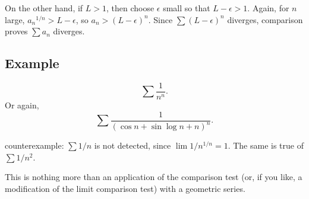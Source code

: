 \documentclass[12pt]{article}
\begin{document}
On the other hand, if $L > 1$, then choose $\epsilon$ small so that $L
- \epsilon > 1$.  Again, for $n$ large, ${a_n}^{1/n} > L - \epsilon$,
so ${a_n} > (L - \epsilon)^n$.  Since $\sum (L - \epsilon)^n$
diverges, comparison proves $\sum a_n$ diverges.

\subsection*{Example}

$$
\sum \frac{1}{n^n}.
$$
Or again,
$$\sum \frac{1}{(\cos n + \sin \log n + n)^n}.$$

counterexample: $\sum 1/n$ is not detected, since $\lim 1/n^{1/n} = 1$.  The same is true of $\sum 1/n^2$.

This is nothing more than an application of the comparison test (or,
if you like, a modification of the limit comparison test) with a
geometric series.
\end{document}
